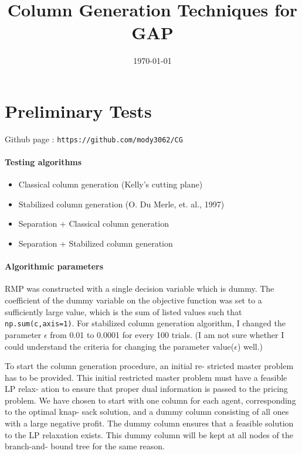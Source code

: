 \documentclass[12pt]{article}
\begin{document}
	\title{Column Generation Techniques for GAP}
	\author{}
	\date{\today}
	\maketitle
	
\section{Preliminary Tests}
Github page : \texttt{https://github.com/mody3062/CG}
\paragraph{Testing algorithms}
\begin{itemize}
	\item Classical column generation (Kelly's cutting plane)
	\item Stabilized column generation (O. Du Merle, et. al., 1997)
	\item Separation + Classical column generation
	\item Separation + Stabilized column generation
\end{itemize}


\paragraph{Algorithmic parameters}

RMP was constructed with a single decision variable which is dummy. The coefficient of the dummy variable on the objective function was set to a sufficiently large value, which is the sum of listed values such that \verb|np.sum(c,axis=1)|. For stabilized column generation algorithm, I changed the parameter $\epsilon$ from 0.01 to 0.0001 for every 100 trials. (I am not sure whether I could understand the criteria for changing the parameter value($\epsilon$) well.)


 To start the column generation procedure, an initial re-
stricted master problem has to be provided. This initial
restricted master problem must have a feasible LP relax-
ation to ensure that proper dual information is passed to
the pricing problem. We have chosen to start with one
column for each agent, corresponding to the optimal knap-
sack solution, and a dummy column consisting of all ones
with a large negative profit. The dummy column ensures
that a feasible solution to the LP relaxation exists. This
dummy column will be kept at all nodes of the branch-and-
bound tree for the same reason.
\end{document}
